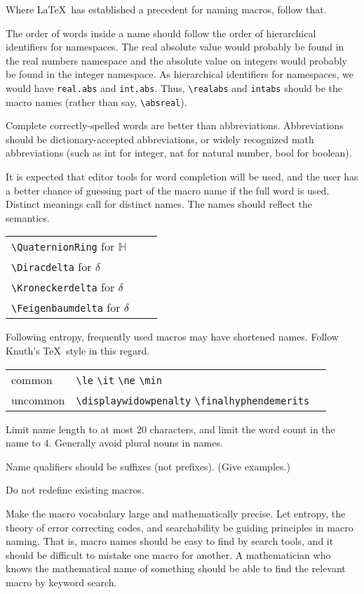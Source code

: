 \documentclass[12pt]{amsart}
\begin{document}
Where \LaTeX\ has established a precedent for naming macros, follow that.

The order of words inside a name should follow the order of hierarchical identifiers for
namespaces.  The real absolute value would probably be found in the real numbers namespace
and the absolute value on integers would probably be found in the integer namespace.
As hierarchical identifiers for namespaces, 
we would have \verb!real.abs! and \verb!int.abs!.  
Thus, \verb!\realabs! and \verb!intabs! should be the macro names
(rather than say, \verb!\absreal!). 

Complete correctly-spelled words are better than abbreviations.  
Abbreviations should be dictionary-accepted abbreviations, or widely recognized
math abbreviations (such as int for integer, nat for natural number, bool for
boolean).  

It is expected that editor tools for
word completion will be used, and the user has a better chance of guessing
part of the macro name if the full word is used.  Distinct meanings call for
distinct names.  The names should reflect the semantics.




\begin{tabular}{l l l}
 \verb!\QuaternionRing! for ${\mathbb H}$ \\
 \verb!\Diracdelta! for $\delta$ \\
 \verb!\Kroneckerdelta! for $\delta$ \\
 \verb!\Feigenbaumdelta! for $\delta$
\end{tabular}



Following entropy, frequently
used macros may have shortened names.  Follow Knuth's \TeX\ style in this regard.
 
\begin{tabular}{ l l l }
common & \verb!\le! \verb!\it! \verb!\ne! \verb!\min! \\
uncommon & \verb!\displaywidowpenalty! \verb!\finalhyphendemerits!
\end{tabular}

Limit name length to at most 20 characters, and limit the word count in the
name to 4.  Generally avoid plural nouns in names. 


Name qualifiers should be suffixes (not prefixes). (Give examples.)

Do not redefine existing macros.

Make the macro vocabulary large and mathematically precise.
Let entropy, the theory of error correcting codes, and searchability 
be guiding principles in macro naming. 
That is, macro names should be easy to find by search tools, and it
should be difficult to mistake one macro for another.  A mathematician
who knows the mathematical name of something should be able to
find the relevant macro by keyword search.
\end{document}
